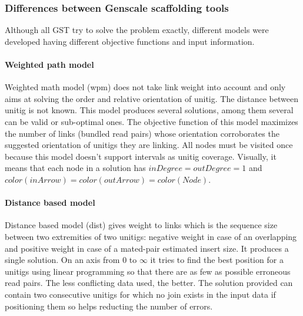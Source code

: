 \documentclass[12pt]{article}
\begin{document}
\subsubsection{Differences between Genscale scaffolding tools}\label{sec:gstdiff}
Although all GST try to solve the problem exactly, different models were developed having different objective functions and input information.
\paragraph*{Weighted path model} Weighted math model (wpm) does not take link weight into account and only aims at solving the order and relative orientation of unitig. The distance between unitig is not known. This model produces several solutions, among them several can be valid or sub-optimal ones. The objective function of this model maximizes the number of links (bundled read pairs) whose orientation corroborates the suggested orientation of unitigs they are linking. All nodes must be visited once because this model doesn't support intervals as unitig coverage. Visually, it means that each node in a solution has $inDegree=outDegree=1$ and $color(inArrow)=color(outArrow)=color(Node)$.

\paragraph*{Distance based model} Distance based model (dist) gives weight to links which is the sequence size between two extremities of two unitigs: negative weight in case of an overlapping and positive weight in case of a mated-pair estimated insert size. It produces a single solution. On an axis from 0 to $\infty$ it tries to find the best position for a unitigs using linear programming so that there are as few as possible erroneous read pairs. The less conflicting data used, the better. The solution provided can contain two consecutive unitigs for which no join exists in the input data if positioning them so helps reducting the number of errors. 
\end{document}
